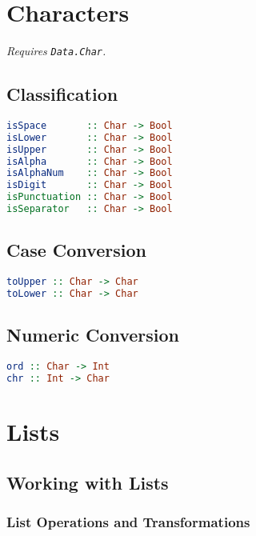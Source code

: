 \documentclass[twocolumn,english]{article}
\begin{document}
\section{Characters}

\emph{Requires }\texttt{\emph{Data.Char}}\emph{.}


\subsection{Classification}

\begin{lstlisting}[language=Haskell,frame=single]
isSpace       :: Char -> Bool
isLower       :: Char -> Bool
isUpper       :: Char -> Bool
isAlpha       :: Char -> Bool
isAlphaNum    :: Char -> Bool
isDigit       :: Char -> Bool
isPunctuation :: Char -> Bool
isSeparator   :: Char -> Bool
\end{lstlisting}



\subsection{Case Conversion}

\begin{lstlisting}[language=Haskell,frame=single]
toUpper :: Char -> Char
toLower :: Char -> Char
\end{lstlisting}



\subsection{Numeric Conversion}

\begin{lstlisting}[language=Haskell,frame=single]
ord :: Char -> Int
chr :: Int -> Char
\end{lstlisting}



\section{Lists}


\subsection{Working with Lists}


\subsubsection{List Operations and Transformations}
\end{document}
